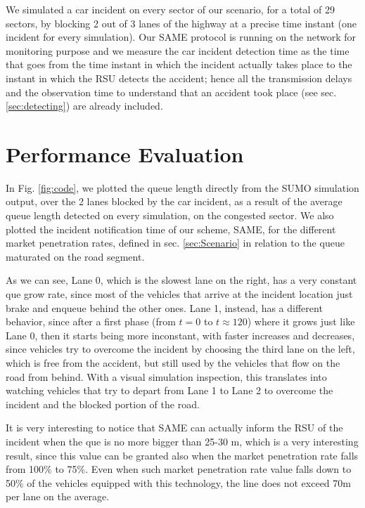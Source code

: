 \documentclass[conference]{IEEEtran}
\begin{document}
We simulated a car incident on every sector of our scenario, for a total of 29 sectors, by blocking 2 out of 3 lanes of the highway at a precise time instant (one incident for every simulation). Our SAME protocol is running on the network for monitoring purpose and we measure the car incident detection time as the time that goes from the time instant in which the incident actually takes place to the instant in which the RSU detects the accident; hence all the transmission delays and the observation time to understand that an accident took place (see sec. \ref{sec:detecting}) are already included.





\section{Performance Evaluation}
\label{sec:performance}

In Fig. \ref{fig:code}, we plotted the queue length directly from the SUMO simulation output, over the 2 lanes blocked by the car incident, as a result of the average queue length detected on every simulation, on the congested sector. We also plotted the incident notification time of our scheme, SAME, for the different market penetration rates, defined in sec. \ref{sec:Scenario} in relation to the queue maturated on the road segment.

As we can see, Lane 0, which is the slowest lane on the right, has a very constant que grow rate, since most of the vehicles that arrive at the incident location just brake and enqueue behind the other ones. Lane 1, instead, has a different behavior, since after a first phase (from $t=0$ to $t \approx 120$) where it grows just like Lane 0, then it starts being more inconstant, with faster increases and decreases, since vehicles try to overcome the incident by choosing the third lane on the left, which is free from the accident, but still used by the vehicles that flow on the road from behind. With a visual simulation inspection, this translates into watching vehicles that try to depart from Lane 1 to Lane 2 to overcome the incident and the blocked portion of the road.

It is very interesting to notice that SAME can actually inform the RSU of the incident when the que is no more bigger than 25-30 m, which is a very interesting result, since this value can be granted also when the market penetration rate falls from 100\% to 75\%. Even when such market penetration rate value falls down to 50\% of the vehicles equipped with this technology, the line does not exceed 70m per lane on the average.
\end{document}
